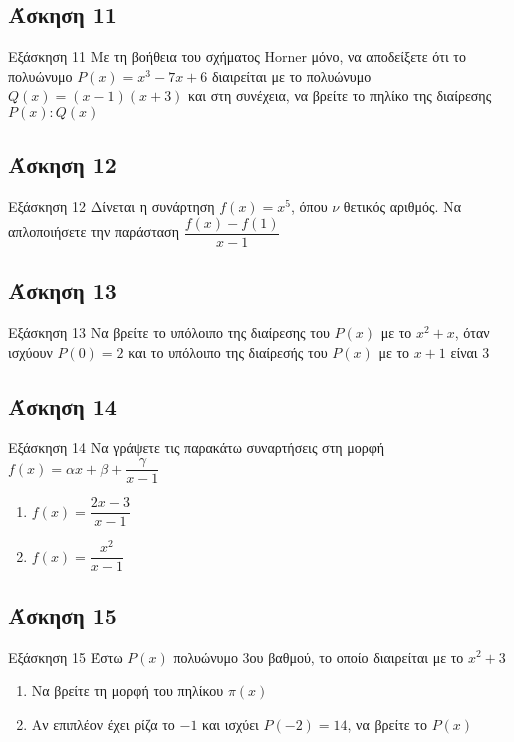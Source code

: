 \documentclass[greek]{beamer}
\begin{document}
\subsection{Άσκηση 11}
\begin{frame}[label=Άσκηση11,t]{Εξάσκηση 11}
 Με τη βοήθεια του σχήματος Horner μόνο, να αποδείξετε ότι το πολυώνυμο $P(x)=x^3-7x+6$ διαιρείται με το πολυώνυμο $Q(x)=(x-1)(x+3)$ και στη συνέχεια, να βρείτε το πηλίκο της διαίρεσης $P(x):Q(x)$

\end{frame}

\subsection{Άσκηση 12}
\begin{frame}[label=Άσκηση12,t]{Εξάσκηση 12}
 Δίνεται η συνάρτηση $f(x)=x^5$, όπου $ν$ θετικός αριθμός. Να απλοποιήσετε την παράσταση $\dfrac{f(x)-f(1)}{x-1}$

\end{frame}

\subsection{Άσκηση 13}
\begin{frame}[label=Άσκηση13,t]{Εξάσκηση 13}
 Να βρείτε το υπόλοιπο της διαίρεσης του $P(x)$ με το $x^2+x$, όταν ισχύουν $P(0)=2$ και το υπόλοιπο της διαίρεσής του $P(x)$ με το $x+1$ είναι $3$

\end{frame}

\subsection{Άσκηση 14}
\begin{frame}[label=Άσκηση14,t]{Εξάσκηση 14}
 Να γράψετε τις παρακάτω συναρτήσεις στη μορφή $f(x)=αx+β+\dfrac{γ}{x-1}$
 \begin{enumerate}
  \item<1-> $f(x)=\dfrac{2x-3}{x-1}$
  \item<2-> $f(x)=\dfrac{x^2}{x-1}$
 \end{enumerate}
\end{frame}

\subsection{Άσκηση 15}
\begin{frame}[label=Άσκηση15,t]{Εξάσκηση 15}
  Έστω $P(x)$ πολυώνυμο 3ου βαθμού, το οποίο διαιρείται με το $x^2+3$
  \begin{enumerate}
    \item<1-> Να βρείτε τη μορφή του πηλίκου $π(x)$
    \item<2-> Αν επιπλέον έχει ρίζα το $-1$ και ισχύει $P(-2)=14$, να βρείτε το $P(x)$
  \end{enumerate}

\end{frame}
\end{document}
